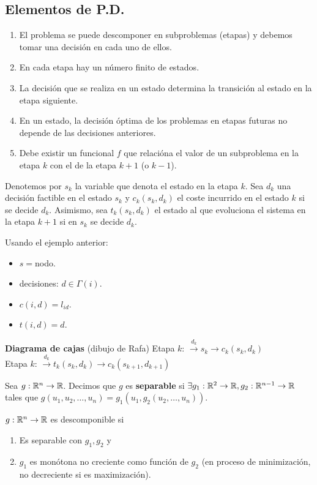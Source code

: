 \documentclass[MIOP.tex]{subfiles}
\begin{document}
\subsection{Elementos de P.D.}
\begin{enumerate}
\item El problema se puede descomponer en subproblemas (etapas) y debemos tomar una decisión en cada uno de ellos.
\item En cada etapa hay un número finito de estados.
\item La decisión que se realiza en un estado determina la transición al estado en la etapa siguiente.
\item En un estado, la decisión óptima de los problemas en etapas futuras no depende de las decisiones anteriores. 
\item Debe existir un funcional $f$ que relacióna el valor de un subproblema en la etapa $k$ con el de la etapa $k+1$ (o $k-1$). 
\end{enumerate}

Denotemos por $s_k$ la variable que denota el estado en la etapa $k$. Sea $d_k$ una decisión factible en el estado $s_k$ y $c_k(s_k,d_k)$ el coste incurrido en el estado $k$ si se decide $d_k$. Asimismo, sea $t_k(s_k,d_k)$ el estado al que evoluciona el sistema en la etapa $k+1$ si en $s_k$ se decide $d_k$.

Usando el ejemplo anterior:
\begin{itemize}
\item $s=$nodo.
\item decisiones: $d\in\Gamma(i)$.
\item $c(i,d)=l_{id}$.
\item $t(i,d)=d$.
\end{itemize}

\textbf{Diagrama de cajas}
(dibujo de Rafa)
Etapa $k$:
$\overset{d_k}{\longrightarrow}\boxed{s_k}\rightarrow c_k(s_k,d_k)$\\
Etapa $k$:
$\overset{d_k}{\longrightarrow}\boxed{t_k(s_k,d_k)}\rightarrow c_k(s_{k+1},d_{k+1})$

\begin{defi}
Sea $g:\mathbb{R}^n\to\mathbb{R}$. Decimos que $g$ es \textbf{separable} si $\exists g_1:\mathbb{R}^2\to\mathbb{R},g_2:\mathbb{R}^{n-1}\to\mathbb{R}$ tales que $g(u_1,u_2,\dots,u_n)=g_1(u_1,g_2(u_2,\dots,u_n))$. 
\end{defi}

\begin{defi}
$g:\mathbb{R}^n\to\mathbb{R}$ es descomponible si
\begin{enumerate}
\item Es separable con $g_1,g_2$ y
\item $g_1$ es monótona no creciente como función de $g_2$ (en proceso de minimización, no decreciente si es maximización). 
\end{enumerate}
\end{defi}
\end{document}
